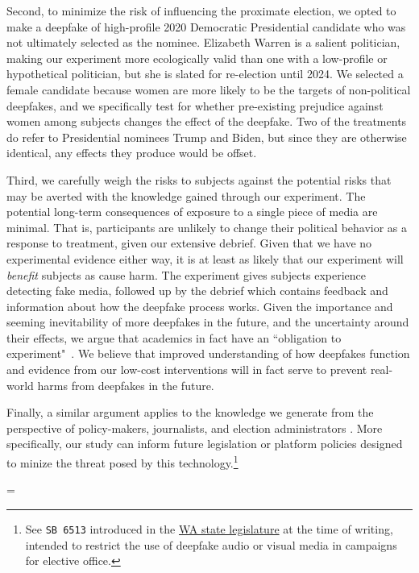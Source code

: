 \documentclass[12pt,letterpaper]{article}
\begin{document}
Second, to minimize the risk of influencing the proximate election, we opted to make a deepfake of high-profile 2020 Democratic Presidential candidate who was not ultimately selected as the nominee. Elizabeth Warren is a salient politician, making our experiment more ecologically valid than one with a low-profile or hypothetical politician, but she is slated for re-election until 2024. We selected a female candidate because women are more likely to be the targets of non-political deepfakes, and we specifically test for whether pre-existing prejudice against women among subjects changes the effect of the deepfake. Two of the treatments do refer to Presidential nominees Trump and Biden, but since they are otherwise identical, any effects they produce would be offset.

Third, we carefully weigh the risks to subjects against the potential risks that may be averted with the knowledge gained through our experiment. The potential long-term consequences of exposure to a single piece of media are minimal. That is, participants are unlikely to change their political behavior as a response to treatment, given our extensive debrief. Given that we have no experimental evidence either way, it is at least as likely that our experiment will \textit{benefit} subjects as cause harm. The experiment gives subjects experience detecting fake media, followed up by the debrief which contains feedback and information about how the deepfake process works. Given the importance and seeming inevitability of more deepfakes in the future, and the uncertainty around their effects, we argue that academics in fact have an ``obligation to experiment"~\citep{ko2016obligation}. We believe that improved understanding of how deepfakes function and evidence from our low-cost interventions will in fact serve to prevent real-world harms from deepfakes in the future.


Finally, a similar argument applies to the knowledge we generate from the perspective of policy-makers, journalists, and election administrators \citep{agarwal2019protecting}. More specifically, our study can inform future legislation or platform policies designed to minize the threat posed by this technology.\footnote{See \texttt{SB 6513} introduced in the \href{https://apps.leg.wa.gov/billsummary/?BillNumber=6513&Year=2020&Initiative=false}{WA state legislature} at the time of writing, intended to restrict the use of deepfake audio or visual media in campaigns for elective office.}


\singlespace  
   
\bibsep=\baselineskip  
{}  
  
\appendix
\end{document}
